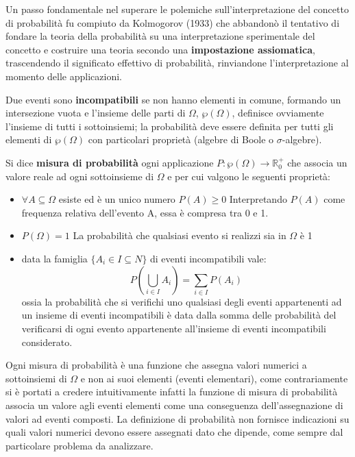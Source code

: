 \documentclass[a4paper,12pt, oneside]{book}
\newcommand{\numberset}{\mathbb}
\newcommand{\R}{\numberset{R}}
\begin{document}
Un passo fondamentale nel superare le polemiche sull'interpretazione del concetto di probabilità
fu compiuto da Kolmogorov (1933) che abbandonò il tentativo di fondare la teoria della probabilità su una 
interpretazione sperimentale del concetto e costruire una teoria secondo una \textbf{impostazione assiomatica},
trascendendo il significato effettivo di probabilità, rinviandone l'interpretazione al momento delle applicazioni.

Due eventi sono \textbf{incompatibili} se non hanno elementi in comune, formando un intersezione vuota
e l'insieme delle parti di $\Omega$, $\wp(\Omega)$, definisce ovviamente l'insieme di tutti i sottoinsiemi;
la probabilità deve essere definita per tutti gli elementi di $\wp(\Omega)$ con particolari proprietà (algebre di Boole o $\sigma$-algebre).

Si dice \textbf{misura di probabilità} ogni applicazione $P: \wp(\Omega) \to \R_0 ^ +$
che associa un valore reale ad ogni sottoinsieme di $\Omega$ e per cui valgono le seguenti proprietà:
\begin{itemize}
        \item $\forall A\subseteq \Omega$ esiste ed è un unico numero $P(A) \geq 0$
              Interpretando $P(A)$ come frequenza relativa dell'evento A, essa è compresa tra 0 e 1.

        \item $P(\Omega) = 1$ La probabilità che qualsiasi evento si realizzi sia in $\Omega$ è 1
        \item data la famiglia $\{A_i\in I\subseteq N\}$ di eventi incompatibili vale:
                \[ P\left(\bigcup_{i\in I}A_i\right) = \sum_{i\in I} P(A_i) \]
              ossia la probabilità che si verifichi uno qualsiasi degli eventi appartenenti ad un insieme
                di eventi incompatibili è data dalla somma delle probabilità del verificarsi di ogni evento 
                appartenente all'insieme di eventi incompatibili considerato.
\end{itemize}
Ogni misura di probabilità è una funzione che assegna valori numerici a sottoinsiemi di $\Omega$
e non ai suoi elementi (eventi elementari), come contrariamente si è portati a credere intuitivamente infatti
la funzione di misura di probabilità associa un valore agli eventi elementi come una conseguenza dell'assegnazione
di valori ad eventi composti.
La definizione di probabilità non fornisce indicazioni su quali valori numerici devono essere assegnati dato che dipende,
come sempre dal particolare problema da analizzare.
\end{document}
